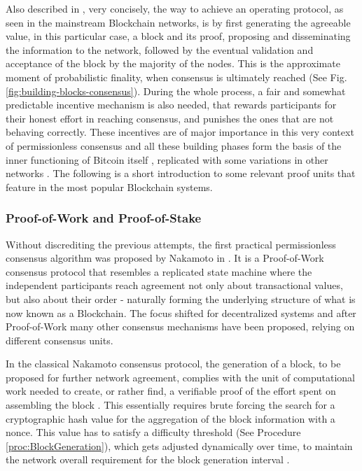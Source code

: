 Also described in \cite{survey-dist-consensus}, very concisely, the way to achieve an operating protocol, as seen in the mainstream Blockchain networks, is by first generating the agreeable value, in this particular case, a block and its proof, proposing and disseminating the information to the network, followed by the eventual validation and acceptance of the block by the majority of the nodes. This is the approximate moment of probabilistic finality, when consensus is ultimately reached (See Fig. \ref{fig:building-blocks-consensus}). During the whole process, a fair and somewhat predictable incentive mechanism is also needed, that rewards participants for their honest effort in reaching consensus, and punishes the ones that are not behaving correctly. These incentives are of major importance in this very context of permissionless consensus and all these building phases form the basis of the inner functioning of Bitcoin itself \cite{nakamoto2008bitcoin}, replicated with some variations in other networks \cite{buterin2014next, survey-dist-consensus}. The following is a short introduction to some relevant proof units that feature in the most popular Blockchain systems.

\subsubsection{Proof-of-Work and Proof-of-Stake}

Without discrediting the previous attempts, the first practical permissionless consensus algorithm was proposed by Nakamoto in \cite{nakamoto2008bitcoin}. It is a Proof-of-Work consensus protocol that resembles a replicated state machine where the independent participants reach agreement not only about transactional values, but also about their order - naturally forming the underlying structure of what is now known as a Blockchain. The focus shifted for decentralized systems and after Proof-of-Work many other consensus mechanisms have been proposed, relying on different consensus units.

In the classical Nakamoto consensus protocol, the generation of a block, to be proposed for further network agreement, complies with the unit of computational work needed to create, or rather find, a verifiable proof of the effort spent on assembling the block \cite{nakamoto2008bitcoin}. This essentially requires brute forcing the search for a cryptographic hash value for the aggregation of the block information with a nonce. This value has to satisfy a difficulty threshold (See Procedure \ref{proc:BlockGeneration}), which gets adjusted dynamically over time, to maintain the network overall requirement for the block generation interval \cite{8629877, survey-dist-consensus}.

